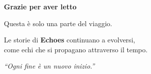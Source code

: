 \cleardoublepage
\thispagestyle{empty}

\vspace*{\fill}

\begin{center}
{\Large \textbf{Grazie per aver letto}}

\vspace{2em}

{\large Questa è solo una parte del viaggio.}

\vspace{1em}

{\normalsize 
Le storie di \textbf{Echoes} continuano a evolversi,\\
come echi che si propagano attraverso il tempo.
}

\vspace{3em}

{\footnotesize
\textit{``Ogni fine è un nuovo inizio.''}
}

\end{center}

\vspace*{\fill}
